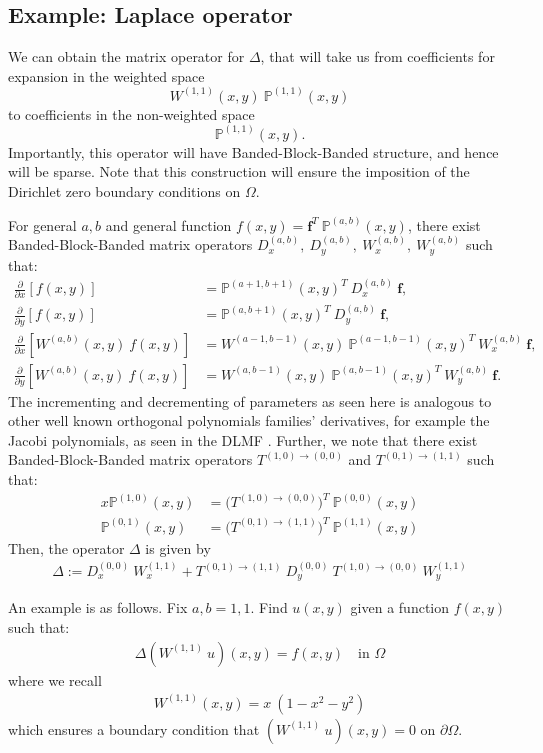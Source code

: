 \documentclass[11pt, oneside]{article}   	%
\newcommand{\bigP}{\mathbb{P}}
\newcommand{\Wab}{{W^{(a,b)}}}
\newcommand{\bigPab}{\bigP^{(a,b)}}
\newcommand{\Wii}{W^{(1,1)}}
\newcommand{\dx}{\frac{\partial}{\partial x}}
\newcommand{\dy}{\frac{\partial}{\partial y}}
\begin{document}
\subsection{Example: Laplace operator}

We can obtain the matrix operator for \(\Delta\), that will take us from coefficients for expansion in the weighted space
\[
\Wii(x,y) \: \bigP^{(1,1)}(x,y)
\]
to coefficients in the non-weighted space
\[
\bigP^{(1,1)}(x,y).
\]
Importantly, this operator will have Banded-Block-Banded structure, and hence will be sparse. Note that this construction will ensure the imposition of the Dirichlet zero boundary conditions on $\Omega$.

For general \(a,b\) and general function \(f(x,y) = \mathbf{f}^T \: \bigPab(x,y)\), there exist Banded-Block-Banded matrix operators \(D_x^{(a,b)}, \: D_y^{(a,b)}, \: W_x^{(a,b)}, \: W_y^{(a,b)}\) such that:
\begin{align}
\dx[f(x,y)] &= \bigP^{(a+1,b+1)}(x,y)^T \: D_x^{(a,b)} \: \mathbf{f}, \\
\dy[f(x,y)] &= \bigP^{(a,b+1)}(x,y)^T \: D_y^{(a,b)} \: \mathbf{f}, \\
\dx[\Wab(x,y) \: f(x,y)] &= W^{(a-1,b-1)}(x,y) \: \bigP^{(a-1,b-1)}(x,y)^T \: W_x^{(a,b)} \: \mathbf{f}, \\
\dy[\Wab(x,y) \: f(x,y)] &= W^{(a,b-1)}(x,y) \: \bigP^{(a,b-1)}(x,y)^T \: W_y^{(a,b)} \: \mathbf{f}.
\end{align}
The incrementing and decrementing of parameters as seen here is analogous to other well known orthogonal polynomials families' derivatives, for example the Jacobi polynomials, as seen in the DLMF \cite{DLMFDerivatives}.
Further, we note that there exist Banded-Block-Banded matrix operators \(T^{(1,0)\to(0,0)}\) and \(T^{(0,1)\to(1,1)}\) such that:
\begin{align}
x \bigP^{(1,0)}(x,y) &= \Big(T^{(1,0)\to(0,0)} \Big)^T \: \bigP^{(0,0)}(x,y) \\
\bigP^{(0,1)}(x,y) &= \Big(T^{(0,1)\to(1,1)} \Big)^T \: \bigP^{(1,1)}(x,y)
\end{align}
Then, the operator \(\Delta\) is given by
\begin{align}
    \Delta := D_x^{(0,0)} \: W_x^{(1,1)} + T^{(0,1)\to(1,1)} \: D_y^{(0,0)} \: T^{(1,0)\to(0,0)} \: W_y^{(1,1)}
\end{align}

An example is as follows. Fix \(a, b = 1,1\). Find \(u(x,y)\) given a function \(f(x,y)\) such that:
\begin{align}
    \Delta(\Wii \: u)(x,y) = f(x,y) \quad \text{in } \Omega
    \end{align}
    where we recall
    \begin{align}
    \Wii(x,y) = x \: (1-x^2-y^2)
\end{align}
which ensures a boundary condition that \((\Wii \: u)(x,y) = 0\) on \(\partial \Omega\).
\end{document}
